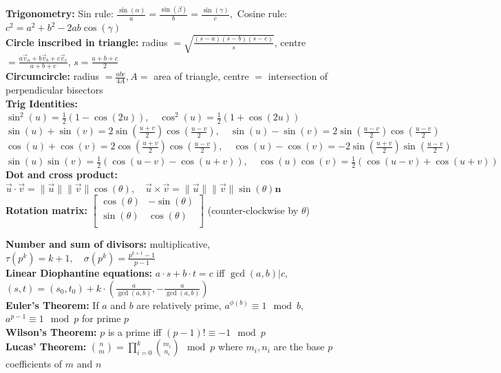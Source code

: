 \documentclass[a4paper,twocolumn]{article}
\newcommand\disappearingrule{%
	\par %
	\vskip5pt %
	\leaders\vrule width 0.4934\textwidth\vskip0.4pt %
	\nointerlineskip %
	\vskip2pt %
}
\begin{document}
{\textbf{Trigonometry: } \textnormal{Sin rule: } $\frac{\sin(\alpha)}{a} = \frac{\sin(\beta)}{b} = \frac{\sin(\gamma)}{c},$ \quad \textnormal{Cosine rule: } $c^2 = a^2 + b^2 - 2ab\cos(\gamma)$ \\
\textbf{Circle inscribed in triangle: } \textnormal{radius $= \sqrt{\frac{(s-a)(s-b)(s-c)}{s}}$, \quad centre $= \frac{a\vec{v}_a + b\vec{v}_b + c\vec{v}_c}{a+b+c}$, \quad $s = \frac{a+b+c}{2}$} \\
\textbf{Circumcircle: } \textnormal{radius $ = \frac{abc}{4A}, A = $ area of triangle, centre $ = $ intersection of perpendicular bisectors }  \\
\textbf{Trig Identities: } $\sin^2(u) = \frac{1}{2}(1-\cos(2u)), \quad \cos^2(u) = \frac{1}{2}(1 + \cos(2u)) $ \\
$\sin(u) + \sin(v) = 2\sin(\frac{u+v}{2})\cos(\frac{u-v}{2}), \quad \sin(u) - \sin(v) = 2\sin(\frac{u-v}{2})\cos(\frac{u-v}{2})$ \\
$\cos(u) + \cos(v) = 2\cos(\frac{u+v}{2})\cos(\frac{u-v}{2}), \quad \cos(u) - \cos(v) = -2\sin(\frac{u+v}{2})\sin(\frac{u-v}{2}) $ \\
$\sin(u)\sin(v) = \frac{1}{2}(\cos(u-v)-\cos(u+v)), \quad \cos(u)\cos(v) = \frac{1}{2}(\cos(u-v)+\cos(u+v))$ \\
\textbf{Dot and cross product: } $\vec{u} \cdot \vec{v} = \|\vec{u}\| \|\vec{v} \| \cos(\theta), \quad \vec{u} \times \vec{v} = \|\vec{u}\| \|\vec{v} \| \sin(\theta) \mathbf{n}$ \\
\textbf{Rotation matrix: } $\begin{bmatrix}
\cos(\theta)       & -\sin(\theta) \\
\sin(\theta)       & \cos(\theta) \\
\end{bmatrix}$ \textnormal{(counter-clockwise by $\theta$)}

\disappearingrule

\textbf{Number and sum of divisors: } \textnormal{multiplicative, $\tau(p^k) = k+1,\quad \sigma(p^k) = \frac{p^{k+1}-1}{p-1}$} \\
\textbf{Linear Diophantine equations: } $a\cdot s + b\cdot t = c$ \textnormal{iff} $\gcd(a,b) | c,$ \quad $(s,t) = (s_0, t_0) + k \cdot \left(\frac{a}{\gcd(a,b)} , -\frac{a}{\gcd(a,b)} \right)$ \\
\textbf{Euler's Theorem: } \textnormal{If $a$ and $b$ are relatively prime, $a^{\phi(b)} \equiv 1 \mod b$, \quad $a^{p-1} \equiv 1 \mod p$ for prime $p$}  \\
\textbf{Wilson's Theorem: } \textnormal{$p$ is a prime iff $(p-1)! \equiv -1 \mod p$} \\
\textbf{Lucas' Theorem: } \textnormal{$\binom{n}{m} = \prod\limits_{i=0}^k \binom{m_i}{n_i} \mod p$ where $m_i, n_i$ are the base $p$ coefficients of $m$ and $n$}  \\

}
\end{document}
